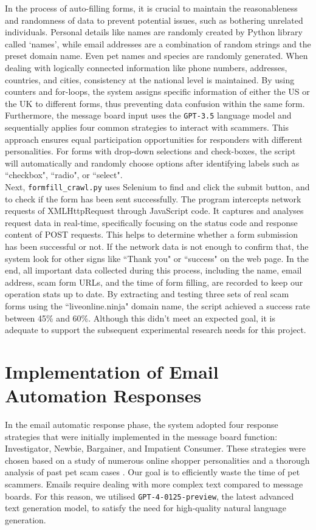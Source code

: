 \documentclass[ oneside,%
                    author={Cassie Qing Tang},
                    degree={BSc},
                     title={An Automated Response System for Disrupting Online Pet Scamming \\ },
                    subtitle={ }]{dissertation}
\begin{document}
In the process of auto-filling forms, it is crucial to maintain the reasonableness and randomness of data to prevent potential issues, such as bothering unrelated individuals. Personal details like names are randomly created by Python library called `names', while email addresses are a combination of random strings and the preset domain name. Even pet names and species are randomly generated. When dealing with logically connected information like phone numbers, addresses, countries, and cities, consistency at the national level is maintained. By using counters and for-loops, the system assigns specific information of either the US or the UK to different forms, thus preventing data confusion within the same form. Furthermore, the message board input uses the \texttt{GPT-3.5} language model and sequentially applies four common strategies to interact with scammers. This approach ensures equal participation opportunities for responders with different personalities. For forms with drop-down selections and check-boxes, the script will automatically and randomly choose options after identifying labels such as ``checkbox", ``radio", or ``select".
\\

Next, \texttt{formfill\_crawl.py} uses Selenium to find and click the submit button, and to check if the form has been sent successfully. The program intercepts network requests of XMLHttpRequest through JavaScript code. It captures and analyses request data in real-time, specifically focusing on the status code and response content of POST requests. This helps to determine whether a form submission has been successful or not. If the network data is not enough to confirm that, the system look for other signs like ``Thank you" or ``success" on the web page. In the end, all important data collected during this process, including the name, email address, scam form URLs, and the time of form filling, are recorded to keep our operation stats up to date. By extracting and testing three sets of real scam forms using the ``liveonline.ninja" domain name, the script achieved a success rate between 45\% and 60\%. Although this didn't meet an expected goal, it is adequate to support the subsequent experimental research needs for this project.


\section{Implementation of Email Automation Responses}
In the email automatic response phase, the system adopted four response strategies that were initially implemented in the message board function: Investigator, Newbie, Bargainer, and Impatient Consumer. These strategies were chosen based on a study of numerous online shopper personalities \cite{noauthor_types_nodate} and a thorough analysis of past pet scam cases \cite{whittaker_understanding_2020}. Our goal is to efficiently waste the time of pet scammers. Emails require dealing with more complex text compared to message boards. For this reason, we utilised \texttt{GPT-4-0125-preview}, the latest advanced text generation model, to satisfy the need for high-quality natural language generation.
\\
\end{document}
